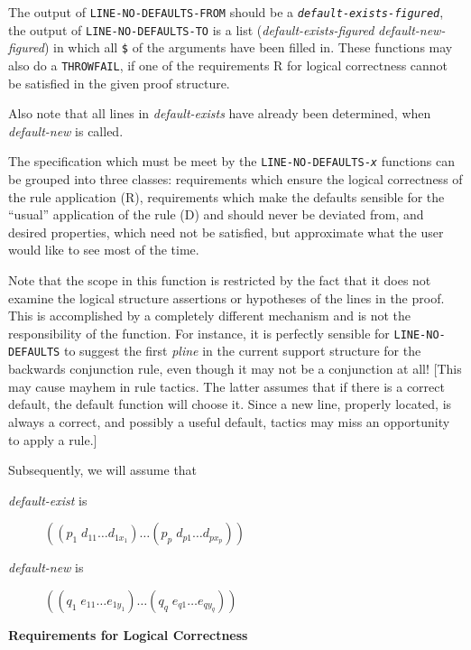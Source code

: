 The output of {\tt LINE-NO-DEFAULTS-FROM} should be a
{\tt {\it default-exists-figured}}, the output of {\tt LINE-NO-DEFAULTS-TO} is
a list {\wt ({\it default-exists-figured} {\it default-new-figured})} in
which all {\tt \$} of the arguments have been filled in.  These functions may
also do a {\tt THROWFAIL}, if one of the requirements R for logical
correctness cannot be satisfied in the given proof structure.

Also note that all lines in {\it default-exists} have already been determined,
when {\it default-new} is called.

The specification which must be meet by the {\tt LINE-NO-DEFAULTS-{\it x}}
functions can be grouped into three classes: requirements which ensure
the logical correctness of the rule application (R), requirements which
make the defaults sensible for the ``usual'' application of the rule (D)
and should never be deviated from, and desired properties, which need
not be satisfied, but approximate what the user would like to see most
of the time.

Note that the scope in this function is restricted by the fact that
it does not examine the logical structure assertions or hypotheses
of the lines in the proof.  This is accomplished by a completely different
mechanism and is not the responsibility of the function.  For instance,
it is perfectly sensible for {\tt LINE-NO-DEFAULTS} to suggest the first
{\it pline} in the current support structure for the backwards conjunction
rule, even though it may not be a conjunction at all! [This may cause mayhem
in rule tactics. The latter assumes that if there is a correct default,
the default function will choose it. Since a new line, properly located,
is always a correct, and possibly a useful default, tactics may miss
an opportunity to apply a rule.]

Subsequently, we will assume that
\begin{description}
\item [{\it default-exist} is ]  $((p_1\; d_{11} \ldots d_{1x_1})\ldots (p_p\; d_{p1}\ldots d_{px_p}))$

\item [{\it default-new} is ]  $((q_1\; e_{11} \ldots e_{1y_1})\ldots (q_q\; e_{q1}\ldots e_{qy_q}))$
\end{description}

\begin{center}
{\bf Requirements for Logical Correctness}
\end{center}

